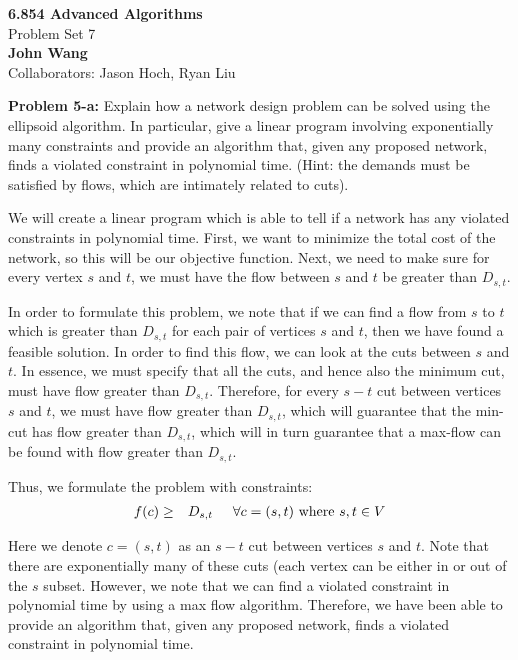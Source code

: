 \documentclass[psamsfonts]{amsart}
\newenvironment{sol}{\vspace{0.25cm}{\large \bfseries Solution:}}{\qedsymbol}
\newenvironment{prob}[1]{\begin{framed}{\large \bfseries Problem #1:}}{\end{framed}}
\newcommand{\makenewtitle}{
    \begin{center}
    {\huge \bfseries 6.854 Advanced Algorithms} \\
    Problem Set 7\\
    \vspace{0.25cm}
    {\bfseries John Wang} \\
    Collaborators: Jason Hoch, Ryan Liu 
    \end{center}
    \vspace{0.5cm}
}
\begin{document}
\newpage
\makenewtitle

\begin{prob}{5-a}
Explain how a network design problem can be solved using the ellipsoid algorithm. In particular, give a linear program involving exponentially many constraints and provide an algorithm that, given any proposed network, finds a violated constraint in polynomial time. (Hint: the demands must be satisfied by flows, which are intimately related to cuts).
\end{prob}
\begin{sol}
We will create a linear program which is able to tell if a network has any violated constraints in polynomial time. First, we want to minimize the total cost of the network, so this will be our objective function. Next, we need to make sure for every vertex $s$ and $t$, we must have the flow between $s$ and $t$ be greater than $D_{s,t}$. 

In order to formulate this problem, we note that if we can find a flow from $s$ to $t$ which is greater than $D_{s,t}$ for each pair of vertices $s$ and $t$, then we have found a feasible solution. In order to find this flow, we can look at the cuts between $s$ and $t$. In essence, we must specify that all the cuts, and hence also the minimum cut, must have flow greater than $D_{s,t}$. Therefore, for every $s-t$ cut between vertices $s$ and $t$, we must have flow greater than $D_{s,t}$, which will guarantee that the min-cut has flow greater than $D_{s,t}$, which will in turn guarantee that a max-flow can be found with flow greater than $D_{s,t}$. 

Thus, we formulate the problem with constraints:
\begin{eqnarray}
f(c) &\geq& D_{s,t} \hspace{0.5cm} \forall c=(s,t) \text{ where } s,t \in V
\end{eqnarray}

Here we denote $c=(s,t)$ as an $s-t$ cut between vertices $s$ and $t$. Note that there are exponentially many of these cuts (each vertex can be either in or out of the $s$ subset. However, we note that we can find a violated constraint in polynomial time by using a max flow algorithm. Therefore, we have been able to provide an algorithm that, given any proposed network, finds a violated constraint in polynomial time. 
\end{sol}
\end{document}
